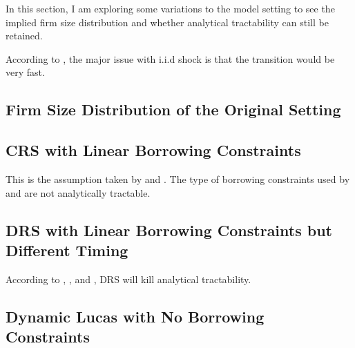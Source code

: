 \documentclass[twoside,11pt,leqno]{article}
\begin{document}
In this section, I am exploring some variations to the model setting to see the implied firm size distribution and whether analytical tractability can still be retained.

According to \citet{Moll:2014}, the major issue with i.i.d shock is that the transition would be very fast.

\subsection{Firm Size Distribution of the Original Setting}

\subsection{CRS with Linear Borrowing Constraints}

This is the assumption taken by \citet{Moll:2014} and \citet{ItskhokiMoll:2019}. The type of borrowing constraints used by \citet{Bueraetal:2011} and \citet{Bueraetal:2013} are not analytically tractable.

\subsection{DRS with Linear Borrowing Constraints but Different Timing}

According to \citet{BueraShin:2013}, \citet{Moll:2014}, and \citet{ItskhokiMoll:2019}, DRS will kill analytical tractability.

\subsection{Dynamic Lucas with No Borrowing Constraints}






\end{document}
